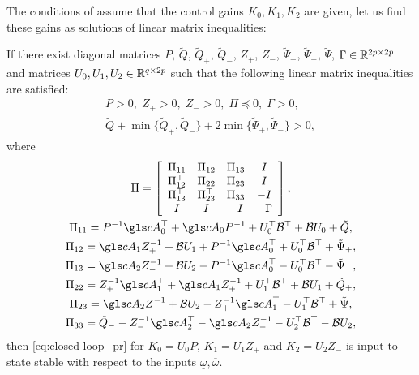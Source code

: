 The conditions of  assume that the control
gains $K_{0},K_{1},K_{2}$ are given, let us find these gains as solutions
of linear matrix inequalities:
\begin{corollary}
	\begin{leftbar}[corollarybar]
	If there exist diagonal matrices $P$, $\tilde{Q}$, $\tilde{Q}_{+}$,
	$\tilde{Q}_{-}$, $Z_{+}$, $Z_{-}$, $\tilde{\Psi}_{+}$, $\tilde{\Psi}_{-}$,
	$\tilde{\Psi}$, $\Gamma\in\mathbb{R}^{2p\times2p}$ and matrices $U_{0},U_{1},U_{2}\in\mathbb{R}^{q\times2p}$
	such that the following linear matrix inequalities are satisfied:
	\begin{gather*}
	P>0,\;Z_{+}>0,\;Z_{-}>0,\;\Pi\preceq0,\;\Gamma>0,\\
	\tilde{Q}+\min\{\tilde{Q}_{+},\tilde{Q}_{-}\}+2\min\{\tilde{\Psi}_{+},\tilde{\Psi}_{-}\}>0,
	\end{gather*}
	where
	\begin{gather*}
	\Pi=\left[\begin{array}{cccc}
	\Pi_{11} & \Pi_{12} & \Pi_{13} & I\\
	\Pi_{12}^{\top} & \Pi_{22} & \Pi_{23} & I\\
	\Pi_{13}^{\top} & \Pi_{23}^{\top} & \Pi_{33} & -I\\
	I & I & -I & -\Gamma
	\end{array}\right],\\
	\Pi_{11}=P^{-1}\cA_{0}^{\top}+\cA_{0}P^{-1}+U_{0}^{\top}\cB^{\top}+\cB U_{0}+\tilde{Q},\\
	\Pi_{12}=\cA_{1}Z_{+}^{-1}+\cB U_{1}+P^{-1}\cA_{0}^{\top}+U_{0}^{\top}\cB^{\top}+\tilde{\Psi}_{+},\\
	\Pi_{13}=\cA_{2}Z_{-}^{-1}+\cB U_{2}-P^{-1}\cA_{0}^{\top}-U_{0}^{\top}\cB^{\top}-\tilde{\Psi}_{-},\\
	\Pi_{22}=Z_{+}^{-1}\cA_{1}^{\top}+\cA_{1}Z_{+}^{-1}+U_{1}^{\top}\cB^{\top}+\cB U_{1}+\tilde{Q}_{+},\\
	\Pi_{23}=\cA_{2}Z_{-}^{-1}+\cB U_{2}-Z_{+}^{-1}\cA_{1}^{\top}-U_{1}^{\top}\cB^{\top}+\tilde{\Psi},\\
	\Pi_{33}=\tilde{Q}_{-}-Z_{-}^{-1}\cA_{2}^{\top}-\cA_{2}Z_{-}^{-1}-U_{2}^{\top}\cB^{\top}-\cB U_{2},
	\end{gather*}
	then \eqref{eq:closed-loop_pr} for $K_{0}=U_{0}P$, $K_{1}=U_{1}Z_{+}$
	and $K_{2}=U_{2}Z_{-}$ is input-to-state stable with respect to the
	inputs $\underline{\omega},\overline{\omega}$.
	\end{leftbar}
\end{corollary}
